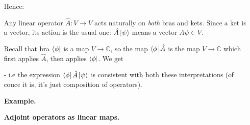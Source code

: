 \documentclass{article}
\begin{document}
Hence:






Any linear operator $\hat{A}: V \rightarrow V $ acts naturally on \textit{both} bras and kets.
Since a ket is a vector, its action is the usual one: $\hat{A}\ket{\psi}$ means a vector $A\psi \in V$.

Recall that bra $\bra{\phi}$ is a map $V \rightarrow \mathbb{C}$, so the map $\bra{\phi}\hat{A}$ is the map $V \rightarrow \mathbb{C}$ which first applies $\hat{A}$, then applies $\bra{\phi}$. We get


- i.e the expression $\bra{\phi}\hat{A}\ket{\psi}$ is consistent with both these interpretations (of couce it is, it's just composition of operators).



\textbf{Example.}


\skl

\textbf{Adjoint operators as linear maps.}

\skl
\end{document}
